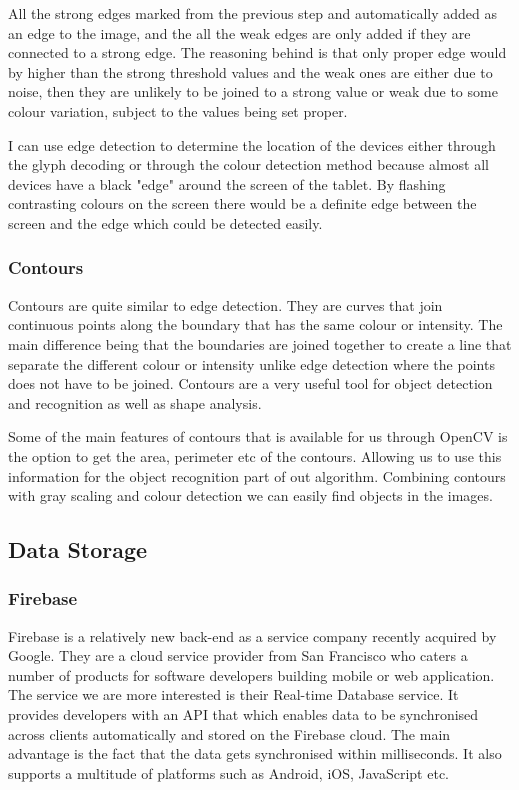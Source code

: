 \begin{enumerate}
All the strong edges marked from the previous step and automatically added as an edge to the image, and the all the weak edges are only added if they are connected to a strong edge. The reasoning behind is that only proper edge would by higher than the strong threshold values and the weak ones are either due to noise, then they are unlikely to be joined to a strong value or weak due to some colour variation, subject to the values being set proper.
\end{enumerate}

I can use edge detection to determine the location of the devices either through the glyph decoding or through the colour detection method because almost all devices have a black "edge" around the screen of the tablet. By flashing contrasting colours on the screen there would be a definite edge between the screen and the edge which could be detected easily.
\subsubsection{Contours}
Contours are quite similar to edge detection. They are curves that join continuous points along the boundary that has the same colour or intensity\cite{contour-opencv}. The main difference being that the boundaries are joined together to create a line that separate the different colour or intensity unlike edge detection where the points does not have to be joined. Contours are a very useful tool for object detection and recognition as well as shape analysis.

Some of the main features of contours that is available for us through OpenCV is the option to get the area, perimeter etc of the contours\cite{contour-features}. Allowing us to use this information for the object recognition part of out algorithm. Combining contours with gray scaling and colour detection we can easily find objects in the images.




\subsection{Data Storage}
\subsubsection{Firebase}

Firebase\cite{firebase} is a relatively new back-end as a service
company recently acquired by Google. They are a cloud service provider
from San Francisco who caters a number of products for software developers
building mobile or web application. The service we are more interested
is their Real-time Database service. It provides developers with an
API that which enables data to be synchronised across clients automatically
and stored on the Firebase cloud. The main advantage is the fact that
the data gets synchronised within milliseconds. It also supports a
multitude of platforms such as Android, iOS, JavaScript etc.
 
